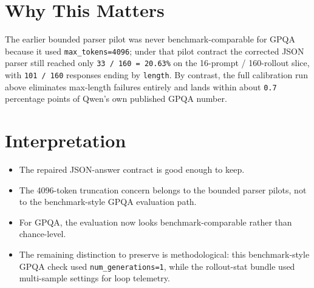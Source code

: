 \documentclass[11pt]{article}
\begin{document}
\section*{Why This Matters}
The earlier bounded parser pilot was never benchmark-comparable for GPQA because it
used \texttt{max\_tokens=4096}; under that pilot contract the corrected JSON parser
still reached only \texttt{33 / 160 = 20.63\%} on the 16-prompt / 160-rollout slice,
with \texttt{101 / 160} responses ending by \texttt{length}. By contrast, the full
calibration run above eliminates max-length failures entirely and lands within about
\texttt{0.7} percentage points of Qwen's own published GPQA number.

\section*{Interpretation}
\begin{itemize}
\item The repaired JSON-answer contract is good enough to keep.
\item The 4096-token truncation concern belongs to the bounded parser pilots, not to
the benchmark-style GPQA evaluation path.
\item For GPQA, the evaluation now looks benchmark-comparable rather than chance-level.
\item The remaining distinction to preserve is methodological: this benchmark-style
GPQA check used \texttt{num\_generations=1}, while the rollout-stat bundle used
multi-sample settings for loop telemetry.
\end{itemize}
\end{document}
